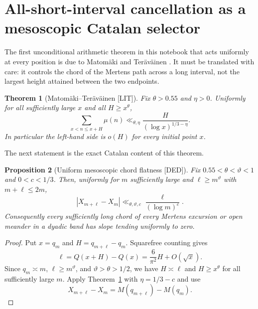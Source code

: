 \documentclass[11pt]{amsart}
\numberwithin{equation}{section}
\theoremstyle{plain}
\newtheorem{theorem}{Theorem}[section]
\newtheorem{proposition}[theorem]{Proposition}
\theoremstyle{definition}
\theoremstyle{remark}
\newcommand{\Mob}{\mu}
\newcommand{\Mert}{M}
\begin{document}
\section{All-short-interval cancellation as a mesoscopic Catalan selector}
\label{sec:mt_catalan_selector}

The first unconditional arithmetic theorem in this notebook that acts
uniformly at every position is due to Matom\"aki and Ter\"av\"ainen
\cite{MatomakiTeravainen2023}.  It must be translated with care: it controls
the chord of the Mertens path across a long interval, not the largest height
attained between the two endpoints.

\begin{theorem}[Matom\"aki--Ter\"av\"ainen \textnormal{[LIT]}]
\label{thm:mt_short_intervals}
Fix $\theta>0.55$ and $\eta>0$.  Uniformly for all sufficiently large $x$ and
all $H\geq x^\theta$,
\begin{equation}
 \sum_{x<n\leq x+H}\Mob(n)
 \ll_{\theta,\eta}
 \frac{H}{(\log x)^{1/3-\eta}}.
\label{eq:mt_short_interval_bound}
\end{equation}
In particular the left-hand side is $o(H)$ for every initial point $x$.
\end{theorem}

The next statement is the exact Catalan content of this theorem.

\begin{proposition}[Uniform mesoscopic chord flatness \textnormal{[DED]}]
\label{prop:mt_compressed_chords}
Fix $0.55<\theta<\vartheta<1$ and $0<c<1/3$.  Then, uniformly for
$m$ sufficiently large and $\ell\geq m^\vartheta$ with $m+\ell\leq2m$,
\begin{equation}
 \left|X_{m+\ell}-X_m\right|
 \ll_{\theta,\vartheta,c}
 \frac{\ell}{(\log m)^c}.
\label{eq:compressed_chord_flatness}
\end{equation}
Consequently every sufficiently long chord of every Mertens excursion or
open meander in a dyadic band has slope tending uniformly to zero.
\end{proposition}

\begin{proof}
Put $x=q_m$ and $H=q_{m+\ell}-q_m$.  Squarefree counting gives
\begin{equation}
 \ell=Q(x+H)-Q(x)=\frac{6}{\pi^2}H+O(\sqrt{x}).
\end{equation}
Since $q_m\asymp m$, $\ell\geq m^\vartheta$, and
$\vartheta>\theta>1/2$, we have $H\asymp\ell$ and $H\geq x^\theta$ for
all sufficiently large $m$.  Apply
Theorem~\ref{thm:mt_short_intervals} with $\eta=1/3-c$ and use
\begin{equation}
 X_{m+\ell}-X_m
 =\Mert(q_{m+\ell})-\Mert(q_m).
\end{equation}
\end{proof}
\end{document}
